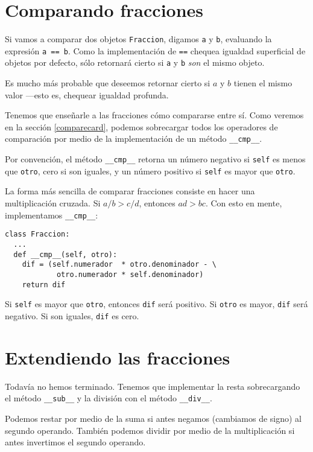 \section{Comparando fracciones}

 

Si vamos a comparar dos objetos \texttt{Fraccion}, digamos \texttt{a}
y \texttt{b}, evaluando la expresión \texttt{a == b}. Como la implementación
de \texttt{==} chequea igualdad superficial de objetos por defecto,
sólo retornará cierto si \texttt{a} y \texttt{b} \textit{son} el mismo
objeto.

Es mucho más probable que deseemos retornar cierto si $a$ y $b$
tienen el mismo valor —esto es, chequear igualdad profunda.

Tenemos que enseñarle a las fracciones cómo compararse entre sí. Como
veremos en la sección \ref{comparecard}, podemos sobrecargar todos
los operadores de comparación por medio de la implementación de un
método \texttt{\_\_cmp\_\_}.

Por convención, el método \texttt{\_\_cmp\_\_} retorna un número negativo
si \texttt{self} es menos que \texttt{otro}, cero si son iguales,
y un número positivo si \texttt{self} es mayor que \texttt{otro}.

La forma más sencilla de comparar fracciones consiste en hacer una
multiplicación cruzada. Si $a/b>c/d$, entonces $ad>bc$. Con esto
en mente, implementamos \texttt{\_\_cmp\_\_}:

\begin{verbatim}
class Fraccion:
  ...
  def __cmp__(self, otro):
    dif = (self.numerador  * otro.denominador - \
            otro.numerador * self.denominador)
    return dif
\end{verbatim}
 Si \texttt{self} es mayor que \texttt{otro}, entonces \texttt{dif}
será positivo. Si \texttt{otro} es mayor, \texttt{dif} será negativo.
Si son iguales, \texttt{dif} es cero.

\section{Extendiendo las fracciones}

Todavía no hemos terminado. Tenemos que implementar la resta sobrecargando
el método \texttt{\_\_sub\_\_} y la división con el método \texttt{\_\_div\_\_}.

Podemos restar por medio de la suma si antes negamos (cambiamos de
signo) al segundo operando. También podemos dividir por medio de la
multiplicación si antes invertimos el segundo operando.

